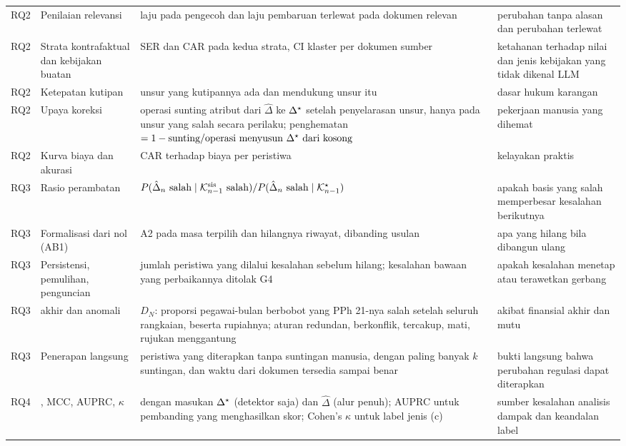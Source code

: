\begin{table}[t]
\begin{tabularx}{\textwidth}{@{}P{1.2cm} P{3.3cm} L P{3.6cm}@{}}
RQ2 & Penilaian relevansi & laju  pada pengecoh dan laju pembaruan terlewat pada dokumen relevan & perubahan tanpa alasan dan perubahan terlewat \\
RQ2 & Strata kontrafaktual dan kebijakan buatan & SER dan CAR pada kedua strata, CI  klaster per dokumen sumber & ketahanan terhadap nilai dan jenis kebijakan yang tidak dikenal LLM \\
RQ2 & Ketepatan kutipan & unsur yang kutipannya ada dan mendukung unsur itu & dasar hukum karangan \\
RQ2 & Upaya koreksi & operasi sunting atribut dari $\hat{\Delta}$ ke $\Delta^{\star}$ setelah penyelarasan unsur, hanya pada unsur yang salah secara perilaku; penghematan $= 1 - \text{sunting}/\text{operasi menyusun } \Delta^{\star} \text{ dari kosong}$ & pekerjaan manusia yang dihemat \\
RQ2 & Kurva biaya dan akurasi & CAR terhadap biaya per peristiwa & kelayakan praktis \\
\midrule
RQ3 & Rasio perambatan & $P(\hat{\Delta}_n \text{ salah} \mid \mathcal{K}^{\mathrm{sis}}_{n-1} \text{ salah}) / P(\hat{\Delta}_n \text{ salah} \mid \mathcal{K}^{\star}_{n-1})$ & apakah basis yang salah memperbesar kesalahan berikutnya \\
RQ3 & Formalisasi dari nol (AB1) & A2 pada masa terpilih dan hilangnya riwayat, dibanding usulan & apa yang hilang bila  dibangun ulang \\
RQ3 & Persistensi, pemulihan, penguncian & jumlah peristiwa yang dilalui kesalahan sebelum hilang; kesalahan bawaan yang perbaikannya ditolak G4 & apakah kesalahan menetap atau terawetkan gerbang \\
RQ3 &  akhir dan anomali & $D_N$: proporsi pegawai-bulan berbobot yang PPh 21-nya salah setelah seluruh rangkaian, beserta rupiahnya; aturan redundan, berkonflik, tercakup, mati, rujukan menggantung & akibat finansial akhir dan mutu  \\
RQ3 & Penerapan langsung & peristiwa yang diterapkan tanpa suntingan manusia, dengan paling banyak $k$ suntingan, dan waktu dari dokumen tersedia sampai  benar & bukti langsung bahwa perubahan regulasi dapat diterapkan \\
\midrule
RQ4 & , MCC, AUPRC, $\kappa$ & dengan masukan $\Delta^{\star}$ (detektor saja) dan $\hat{\Delta}$ (alur penuh); AUPRC untuk pembanding yang menghasilkan skor; Cohen's $\kappa$ untuk label jenis (c) & sumber kesalahan analisis dampak dan keandalan label \\
\bottomrule
\end{tabularx}
\end{table}

